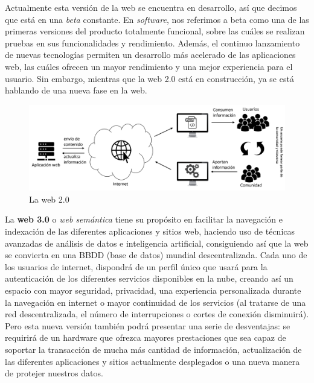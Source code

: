 \documentclass[../main.tex]{subfiles}
\begin{document}
     Actualmente esta versión de la web se encuentra en desarrollo, así que decimos que está en una \textit{beta} constante. En \textit{software}, nos referimos a beta como una de las primeras versiones del producto totalmente funcional, sobre las cuáles se realizan pruebas en sus funcionalidades y rendimiento. Además, el continuo lanzamiento de nuevas tecnologías permiten un desarrollo más acelerado de las aplicaciones web, las cuáles ofrecen un mayor rendimiento y una mejor experiencia para el usuario. 
     Sin embargo, mientras que la web 2.0 está en construcción, ya se está hablando de una nueva fase en la web. \\
    
     \begin{figure}[!h]
          \centering
          \includegraphics[width=\textwidth]{images/web2.0.png}
          \caption{La web 2.0}
          \label{fig:web2.0}
      \end{figure}

    La \textbf{web 3.0} o \textit{web semántica} tiene su propósito en facilitar la navegación e indexación de las diferentes aplicaciones y sitios web, haciendo uso de técnicas avanzadas de análisis de datos e inteligencia artificial, consiguiendo así que la web se convierta en una BBDD (base de datos) mundial descentralizada. Cada uno de los usuarios de internet, dispondrá de un perfil único que usará para la autenticación de los diferentes servicios disponibles en la nube, creando así un espacio con mayor seguridad, privacidad, una experiencia personalizada durante la navegación en internet o mayor continuidad de los servicios (al tratarse de una red descentralizada, el número de interrupciones o cortes de conexión disminuirá). Pero esta nueva versión también podrá presentar una serie de desventajas: se requirirá de un hardware que ofrezca mayores prestaciones que sea capaz de soportar la transacción de mucha más cantidad de información, actualización de las diferentes aplicaciones y sitios actualmente desplegados o una nueva manera de protejer nuestros datos.  
    
\end{document}

